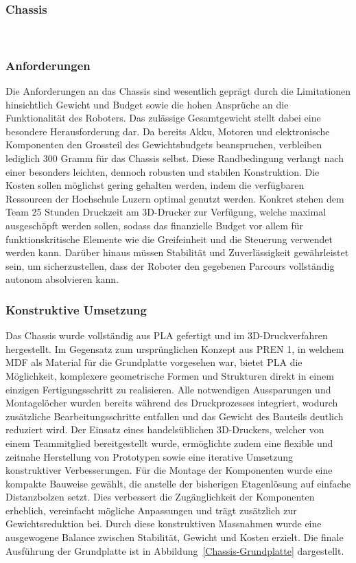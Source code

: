 \documentclass[main.tex]{subfiles} %
\begin{document}

\subsubsection{Chassis}~\label{sec:Chassis}

\subsubsection*{Anforderungen}

Die Anforderungen an das Chassis sind wesentlich geprägt durch die Limitationen 
hinsichtlich Gewicht und Budget sowie die hohen Ansprüche an die Funktionalität 
des Roboters. Das zulässige Gesamtgewicht stellt dabei eine besondere 
Herausforderung dar. Da bereits Akku, Motoren und elektronische Komponenten 
den Grossteil des Gewichtsbudgets beanspruchen, verbleiben lediglich 300 Gramm 
für das Chassis selbst. Diese Randbedingung verlangt nach einer besonders 
leichten, dennoch robusten und stabilen Konstruktion. Die Kosten sollen möglichst 
gering gehalten werden, indem die verfügbaren Ressourcen der Hochschule Luzern 
optimal genutzt werden. Konkret stehen dem Team 25 Stunden Druckzeit am 3D-Drucker 
zur Verfügung, welche maximal ausgeschöpft werden sollen, sodass das finanzielle 
Budget vor allem für funktionskritische Elemente wie die Greifeinheit 
und die Steuerung verwendet werden kann. Darüber hinaus müssen Stabilität und 
Zuverlässigkeit gewährleistet sein, um sicherzustellen, dass der Roboter den 
gegebenen Parcours vollständig autonom absolvieren kann.

\newpage

\subsubsection*{Konstruktive Umsetzung}

Das Chassis wurde vollständig aus PLA gefertigt und im 3D-Druckverfahren 
hergestellt. Im Gegensatz zum ursprünglichen Konzept aus PREN 1, in welchem 
MDF als Material für die Grundplatte vorgesehen war, bietet PLA die 
Möglichkeit, komplexere geometrische Formen und Strukturen direkt in einem 
einzigen Fertigungsschritt zu realisieren. Alle notwendigen Aussparungen 
und Montagelöcher wurden bereits während des Druckprozesses integriert, 
wodurch zusätzliche Bearbeitungsschritte entfallen und das Gewicht des 
Bauteils deutlich reduziert wird. Der Einsatz eines handelsüblichen 
3D-Druckers, welcher von einem Teammitglied bereitgestellt wurde, 
ermöglichte zudem eine flexible und zeitnahe Herstellung von Prototypen 
sowie eine iterative Umsetzung konstruktiver Verbesserungen. Für die Montage 
der Komponenten wurde eine kompakte Bauweise gewählt, die anstelle der 
bisherigen Etagenlösung auf einfache Distanzbolzen setzt. Dies verbessert die 
Zugänglichkeit der Komponenten erheblich, vereinfacht mögliche Anpassungen 
und trägt zusätzlich zur Gewichtsreduktion bei. Durch diese konstruktiven 
Massnahmen wurde eine ausgewogene Balance zwischen Stabilität, Gewicht und 
Kosten erzielt. Die finale Ausführung der Grundplatte ist in 
Abbildung~\ref{Chassis-Grundplatte} dargestellt.
\end{document}
